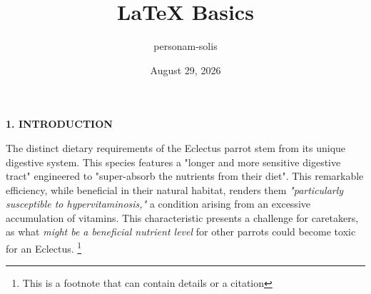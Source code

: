\documentclass[twocolumn]{article} %
\title{\textbf{LaTeX Basics}}
\author{personam-solis}
\date{August 29, 2026}
\begin{document}

\vspace{\baselineskip}

\begin{center}
\textbf{1. INTRODUCTION}
\end{center}
The distinct dietary requirements of the Eclectus parrot stem from its unique digestive system. This species features a "longer and more sensitive digestive tract" engineered to "super-absorb the nutrients from their diet".
 This remarkable efficiency, while beneficial in their natural habitat, renders them \emph{"particularly susceptible to hypervitaminosis,"} a condition arising from an excessive accumulation of vitamins.
 This characteristic presents a challenge for caretakers, as what \textit{might be a beneficial nutrient level} for other parrots could become toxic for an Eclectus.
\footnote{This is a footnote that can contain details or a citation}
\end{document}

